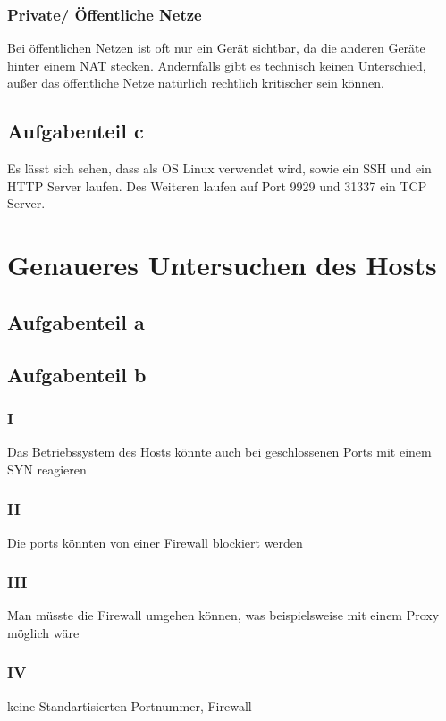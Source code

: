 \documentclass[a4paper,12pt,
headsepline,           %
twoside,               %
pointlessnumbers,      %
bibtotoc,              %
BCOR15mm               %
]{scrbook}
\begin{document}
\subsubsection*{Private/ Öffentliche Netze}
Bei öffentlichen Netzen ist oft nur ein Gerät sichtbar, da die anderen Geräte hinter einem NAT stecken. Andernfalls gibt es technisch keinen Unterschied, außer das öffentliche Netze natürlich rechtlich kritischer sein können.

\subsection*{Aufgabenteil c}


Es lässt sich sehen, dass als OS Linux verwendet wird, sowie  ein SSH und ein HTTP Server laufen. Des Weiteren laufen auf Port 9929 und 31337 ein TCP Server.

\section*{Genaueres Untersuchen des Hosts}
\subsection*{Aufgabenteil a}

\subsection*{Aufgabenteil b}
\subsubsection*{I}
Das Betriebssystem des Hosts könnte auch bei geschlossenen Ports mit einem SYN reagieren
\subsubsection*{II}
Die ports könnten von einer Firewall blockiert werden
\subsubsection*{III}
Man müsste die Firewall umgehen können, was beispielsweise mit einem Proxy möglich wäre
\subsubsection*{IV}
keine Standartisierten Portnummer, Firewall
\end{document}
